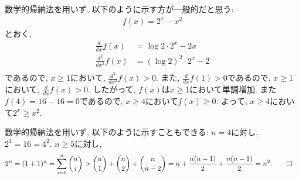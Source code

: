 \begin{rem}
  数学的帰納法を用いず, 以下のように示す方が一般的だと思う:
  \begin{align*}
    f(x)=2^x-x^2
  \end{align*}
  とおく.
  \begin{align*}
    \frac{d}{dx}f(x)&=\log 2 \cdot 2^x-2x\\
    \frac{d^2}{dx^2}f(x)&=(\log 2)^2 \cdot 2^x-2\\
  \end{align*}
  であるので, $x\geq 1$において,
  $\frac{d^2}{dx^2}f(x)>0$.
  また, $\frac{d}{dx}f(1)>0$であるので,
  $x\geq 1$において,
  $\frac{d}{dx}f(x)> 0$.
  したがって, $f(x)$は$x\geq 1$において単調増加.
  また$f(4)=16-16=0$であるので,
  $x\geq 4$において$f(x) \geq 0$.
  よって, $x\geq 4$において$2^x\geq x^2$.
\end{rem}

\begin{rem}
  数学的帰納法を用いず, 以下のように示すこともできる:
  $n=4$に対し, $2^4=16=4^2$.
  $n\geq 5$に対し, 
  \begin{align*}
    2^n=(1+1)^n=\sum_{i=0}^n \binom{n}{i}
    &> \binom{n}{1}+\binom{n}{2}+\binom{n}{n-2}
    =n+\frac{n(n-1)}{2}+\frac{n(n-1)}{2}
    =n^2
    .\qedhere
  \end{align*}
\end{rem}


